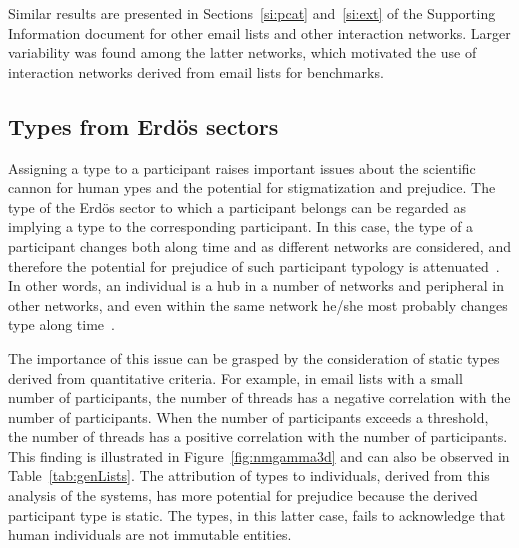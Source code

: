 \documentclass[%
	aip,
	jmp,%
	amsmath,amssymb,
	reprint,%
]{revtex4-1}
\begin{document}
Similar results are presented in Sections~\ref{si:pcat} and~\ref{si:ext}
of the Supporting Information document for other email lists and other interaction networks.
Larger variability was found among the latter networks,
which motivated the
use of interaction networks derived from email lists for benchmarks.


\subsection{Types from Erd\"os sectors}\label{sec:pty}
Assigning a type to a participant raises important 
issues about the scientific cannon for human ypes
and the potential for stigmatization and prejudice. 
The type of the Erd\"os sector to which a participant belongs 
can be regarded as implying a type to the corresponding participant.
In this case, the type of a participant
changes both along time and as
different networks are considered,
and therefore the potential for prejudice of such
participant typology is attenuated~\cite{adorno}. 
In other words, an individual is a hub in a number of networks and peripheral in other networks,
and even within the same network he/she most probably changes type along time~\cite{animacoes}.

The importance of this issue can be grasped by
the consideration of static types derived from quantitative criteria.
For example, in email lists with a small number of participants,
the number of threads has a negative correlation
with the number of participants.
When the number of participants exceeds a threshold,
the number of threads has a positive correlation
with the number of participants.
This finding is illustrated in Figure~\ref{fig:nmgamma3d}
and can also be observed in Table~\ref{tab:genLists}.
The attribution of types to individuals, derived from 
this analysis of the systems, has more potential for prejudice because
the derived participant type is static.
The types, in this latter case, fails to acknowledge that
human individuals are not immutable entities.
\end{document}
